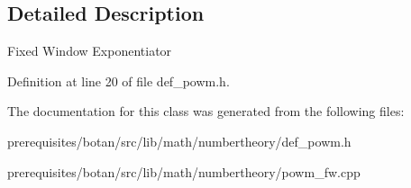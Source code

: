 \subsection{Detailed Description}
Fixed Window Exponentiator 

Definition at line 20 of file def\+\_\+powm.\+h.



The documentation for this class was generated from the following files\+:\begin{DoxyCompactItemize}
\item 
prerequisites/botan/src/lib/math/numbertheory/def\+\_\+powm.\+h\item 
prerequisites/botan/src/lib/math/numbertheory/powm\+\_\+fw.\+cpp\end{DoxyCompactItemize}
